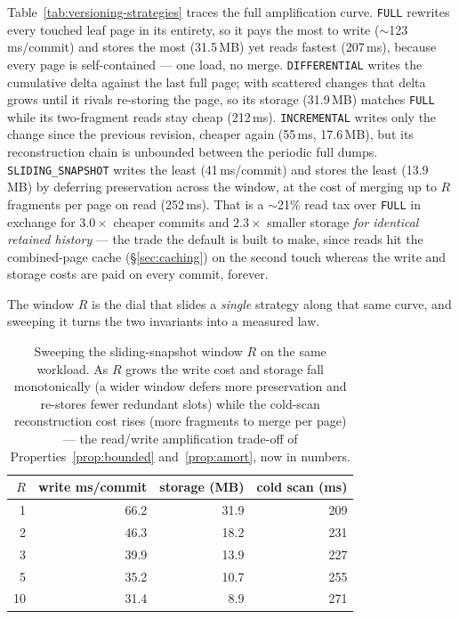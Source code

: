 \documentclass[11pt,a4paper,oneside]{report}
\theoremstyle{sirixthm}
\newcommand{\code}[1]{\texttt{#1}}
\begin{document}
Table~\ref{tab:versioning-strategies} traces the full amplification curve. \code{FULL} rewrites every
touched leaf page in its entirety, so it pays the most to write ($\sim$123\,ms/commit) and stores the most
(31.5\,MB) yet reads fastest (207\,ms), because every page is self-contained --- one load, no merge.
\code{DIFFERENTIAL} writes the cumulative delta against the last full page; with scattered changes that
delta grows until it rivals re-storing the page, so its storage (31.9\,MB) matches \code{FULL} while its
two-fragment reads stay cheap (212\,ms). \code{INCREMENTAL} writes only the change since the previous
revision, cheaper again (55\,ms, 17.6\,MB), but its reconstruction chain is unbounded between the periodic
full dumps. \code{SLIDING\_SNAPSHOT} writes the least (41\,ms/commit) and stores the least (13.9\,MB) by
deferring preservation across the window, at the cost of merging up to $R$ fragments per page on read
(252\,ms). That is a $\sim$21\% read tax over \code{FULL} in exchange for $3.0\times$ cheaper commits and
$2.3\times$ smaller storage \emph{for identical retained history} --- the trade the default is built to
make, since reads hit the combined-page cache (\S\ref{sec:caching}) on the second touch whereas the write
and storage costs are paid on every commit, forever.

The window $R$ is the dial that slides a \emph{single} strategy along that same curve, and sweeping it
turns the two invariants into a measured law.

\begin{table}[h]
\centering\footnotesize\setlength{\tabcolsep}{7pt}\renewcommand{\arraystretch}{1.25}
\begin{tabular}{@{}r r r r@{}}
\toprule
\textbf{$R$} & \textbf{write ms/commit} & \textbf{storage (MB)} & \textbf{cold scan (ms)}\\
\midrule
1  & 66.2 & 31.9 & 209\\
2  & 46.3 & 18.2 & 231\\
3  & 39.9 & 13.9 & 227\\
5  & 35.2 & 10.7 & 255\\
10 & 31.4 & 8.9  & 271\\
\bottomrule
\end{tabular}
\caption{Sweeping the sliding-snapshot window $R$ on the same workload. As $R$ grows the write cost and
storage fall monotonically (a wider window defers more preservation and re-stores fewer redundant slots)
while the cold-scan reconstruction cost rises (more fragments to merge per page) --- the read/write
amplification trade-off of Properties~\ref{prop:bounded} and~\ref{prop:amort}, now in numbers.}
\label{tab:versioning-window}
\end{table}
\end{document}
